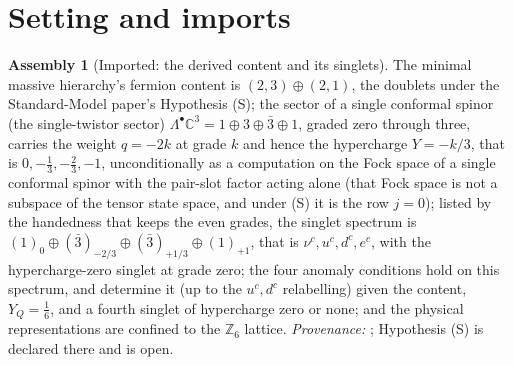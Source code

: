 \documentclass[11pt]{article}
\theoremstyle{definition}
\newtheorem{assembled}[theorem]{Assembly}
\theoremstyle{plain}
\newcommand{\changedmark}[2]{\marginpar{\raggedright\scriptsize\color{#1}#2}}
\providecommand{\C}{}\renewcommand{\C}{\mathbb{C}}
\begin{document}
\section{Setting and imports}

\begin{assembled}[Imported: the derived content and its singlets]\label{c:neutrino.imported-derived-content-singlets}
\changedmark{gray}{reworded}
The minimal massive hierarchy's fermion content is $(2,3) \oplus (2,1)$, the doublets under the Standard-Model paper's Hypothesis (S); the sector of a single conformal spinor (the single-twistor sector) $\Lambda^{\bullet}\C^{3} = 1 \oplus 3 \oplus \bar{3} \oplus 1$, graded zero through three, carries the weight $q = -2k$ at grade $k$ and hence the hypercharge $Y = -k/3$, that is $0, -\tfrac13, -\tfrac23, -1$, unconditionally as a computation on the Fock space of a single conformal spinor with the pair-slot factor acting alone (that Fock space is not a subspace of the tensor state space, and under (S) it is the row $j = 0$); listed by the handedness that keeps the even grades, the singlet spectrum is $(1)_{0} \oplus (\bar{3})_{-2/3} \oplus (\bar{3})_{+1/3} \oplus (1)_{+1}$, that is $\nu^{c}, u^{c}, d^{c}, e^{c}$, with the hypercharge-zero singlet at grade zero; the four anomaly conditions hold on this spectrum, and determine it (up to the $u^{c}, d^{c}$ relabelling) given the content, $Y_{Q} = \tfrac16$, and a fourth singlet of hypercharge zero or none; and the physical representations are confined to the $\mathbb{Z}_{6}$ lattice. \emph{Provenance:} \cite[Prop.~5.1, Prop.~5.3, Thm.~5.5, Thm.~4.2]{ButlerT12}; Hypothesis (S) is declared there and is open.
\end{assembled}
\end{document}
